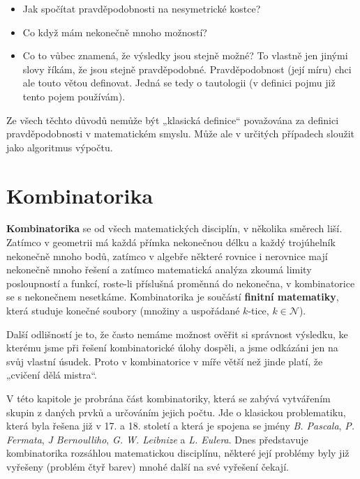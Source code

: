    \begin{itemize}[noitemsep]
      \item Jak spočítat pravděpodobnosti na nesymetrické kostce?
      \item Co když mám nekonečně mnoho možností? 
      \item Co to vůbec znamená, že výsledky jsou stejně možné? To vlastně jen jinými slovy říkám,
            že jsou stejně pravděpodobné. Pravděpodobnost (její míru) chci ale touto větou deﬁnovat.
            Jedná se tedy o tautologii (v deﬁnici pojmu již tento pojem používám).
    \end{itemize}
    
    Ze všech těchto důvodů nemůže být „klasická definice“ považována za definici pravděpodobnosti v
    matematickém smyslu. Může ale v určitých případech sloužit jako algoritmus výpočtu.
 

  \section{Kombinatorika}\label{mai:IchapIVsecI}
    \textbf{Kombinatorika} se od všech matematických disciplín, v několika směrech liší. Zatímco v
    geometrii má každá přímka nekonečnou délku a každý trojúhelník nekonečně mnoho bodů, zatímco v
    algebře některé rovnice i nerovnice mají nekonečně mnoho řešení a zatímco matematická analýza
    zkoumá limity posloupností a funkcí, roste-li příslušná proměnná do nekonečna, v kombinatorice
    se s nekonečnem nesetkáme. Kombinatorika je součástí \textbf{finitní matematiky}, která studuje
    konečné soubory (množiny a uspořádané \(k\)-tice, \(k\in \mathcal{N}\)). 
    
    Další odlišností je to, že často nemáme možnost ověřit si správnost výsledku, ke kterému jsme 
    při řešení kombinatorické úlohy dospěli, a jsme odkázáni jen na svůj vlastní úsudek. Proto v 
    kombinatorice v míře větší než jinde platí, že „cvičení dělá mistra“. 
    
    V této kapitole je probrána část kombinatoriky, která se zabývá vytvářením skupin z daných 
    prvků a určováním jejich počtu. Jde o klasickou problematiku, která byla řešena již v 17. a 18. 
    století a která je spojena se jmény \emph{B. Pascala}, \emph{P. Fermata}, \emph{J Bernoulliho}, 
    \emph{G. W. Leibnize}  a \emph{L. Eulera}. Dnes představuje kombinatorika rozsáhlou 
    matematickou disciplínu, některé její problémy byly již vyřešeny (problém čtyř barev) mnohé 
    další na své vyřešení čekají. 
    
